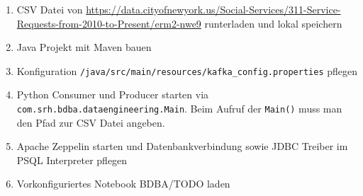\begin{enumerate}
	\item CSV Datei von \hyperref[hier]{https://data.cityofnewyork.us/Social-Services/311-Service-Requests-from-2010-to-Present/erm2-nwe9} runterladen und lokal speichern
	\item Java Projekt mit Maven bauen
	\item Konfiguration \texttt{/java/src/main/resources/kafka\_config.properties} pflegen
	\item Python Consumer und Producer starten via \texttt{com.srh.bdba.dataengineering.Main}. Beim Aufruf der \texttt{Main()} muss man den Pfad zur CSV Datei angeben.
	\item Apache Zeppelin starten und Datenbankverbindung sowie JDBC Treiber im PSQL Interpreter pflegen
	\item Vorkonfiguriertes Notebook BDBA/TODO laden
\end{enumerate}
